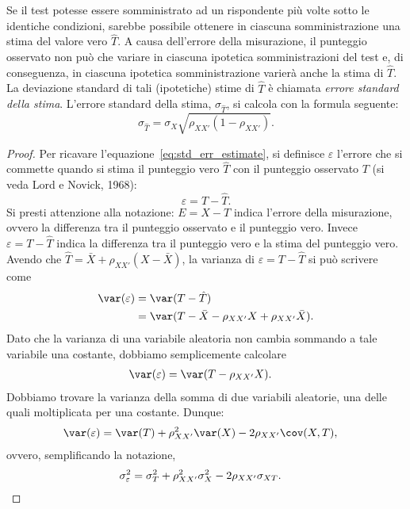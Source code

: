 Se il test potesse essere somministrato ad un rispondente più volte sotto le identiche condizioni, sarebbe possibile ottenere in ciascuna somministrazione una stima del valore vero $\hat{T}$. 
A causa dell'errore della misurazione, il punteggio osservato non può che variare in ciascuna ipotetica somministrazioni del test e, di conseguenza, in ciascuna ipotetica somministrazione varierà anche la stima di $\hat{T}$.
La deviazione standard di tali (ipotetiche) stime di $\hat{T}$ è chiamata \textit{errore standard della stima}. 
L'errore standard della stima, $\sigma_{\hat{T}}$, si calcola con la formula seguente:
\begin{equation}
\sigma_{\hat{T}} = \sigma_X \sqrt{\rho_{XX'} (1 -\rho_{XX'})}.
\label{eq:std_err_estimate}
\end{equation}

\begin{proof}
Per ricavare l'equazione~\ref{eq:std_err_estimate}, si definisce $\varepsilon$ l'errore che si commette quando si stima il punteggio vero $\hat{T}$ con il punteggio osservato $T$ (si veda Lord e Novick, 1968):
\begin{equation}
\varepsilon = T - \hat{T}.
\end{equation}
Si presti attenzione alla notazione: $E = X - T$ indica l'errore della misurazione, ovvero la differenza tra il punteggio osservato e il punteggio vero. 
Invece $\varepsilon = T - \hat{T}$ indica la differenza tra il punteggio vero e la stima del punteggio vero. 
Avendo che $\hat{T} = \bar{X} + \rho_{XX'} (X - \bar{X})$, la varianza di $\varepsilon = T - \hat{T}$ si può scrivere come
\begin{align}
\var(\varepsilon) &=  \var(T - \hat{T})\notag\\
&= \var(T - \bar{X} - \rho_{XX'} X + \rho_{XX'}\bar{X}).\notag
\end{align}
Dato che la varianza di una variabile aleatoria non cambia sommando a tale variabile una costante, dobbiamo semplicemente calcolare 
\begin{align}
\var(\varepsilon) &= \var(T - \rho_{XX'}X).
\end{align}
Dobbiamo trovare la varianza della somma di due variabili aleatorie, una delle quali moltiplicata per una costante. Dunque: 
\begin{align}
\var(\varepsilon) &= \var(T) + \rho_{XX'}^2 \var(X) - 2  \rho_{XX'} \cov(X,T),\notag
\end{align}
ovvero, semplificando la notazione, 
\begin{align}
\sigma^2_{\varepsilon} &= \sigma^2_T + \rho_{XX'}^2 \sigma^2_X - 2  \rho_{XX'} \sigma_{XT}.\notag

\end{align}
\end{proof}

